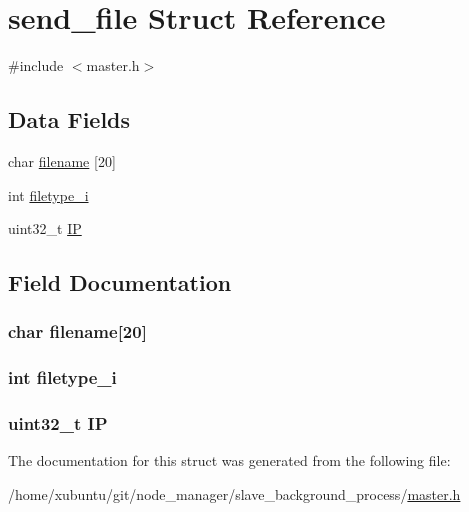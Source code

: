 \hypertarget{structsend__file}{}\section{send\+\_\+file Struct Reference}
\label{structsend__file}


{\ttfamily \#include $<$master.\+h$>$}

\subsection*{Data Fields}
\begin{DoxyCompactItemize}
\item 
char \hyperlink{structsend__file_adcdd8de726cde3547da221fceaf70391}{filename} \mbox{[}20\mbox{]}
\item 
int \hyperlink{structsend__file_a87720c6483ddde13d7d3c079bd84d7f5}{filetype\+\_\+i}
\item 
uint32\+\_\+t \hyperlink{structsend__file_a7dfc7538cc29332ef7bb54fb8ff72ffc}{I\+P}
\end{DoxyCompactItemize}


\subsection{Field Documentation}
\hypertarget{structsend__file_adcdd8de726cde3547da221fceaf70391}{}
\subsubsection[{filename}]{\setlength{\rightskip}{0pt plus 5cm}char filename\mbox{[}20\mbox{]}}\label{structsend__file_adcdd8de726cde3547da221fceaf70391}
\hypertarget{structsend__file_a87720c6483ddde13d7d3c079bd84d7f5}{}
\subsubsection[{filetype\+\_\+i}]{\setlength{\rightskip}{0pt plus 5cm}int filetype\+\_\+i}\label{structsend__file_a87720c6483ddde13d7d3c079bd84d7f5}
\hypertarget{structsend__file_a7dfc7538cc29332ef7bb54fb8ff72ffc}{}
\subsubsection[{I\+P}]{\setlength{\rightskip}{0pt plus 5cm}uint32\+\_\+t I\+P}\label{structsend__file_a7dfc7538cc29332ef7bb54fb8ff72ffc}


The documentation for this struct was generated from the following file\+:\begin{DoxyCompactItemize}
\item 
/home/xubuntu/git/node\+\_\+manager/slave\+\_\+background\+\_\+process/\hyperlink{master_8h}{master.\+h}\end{DoxyCompactItemize}

